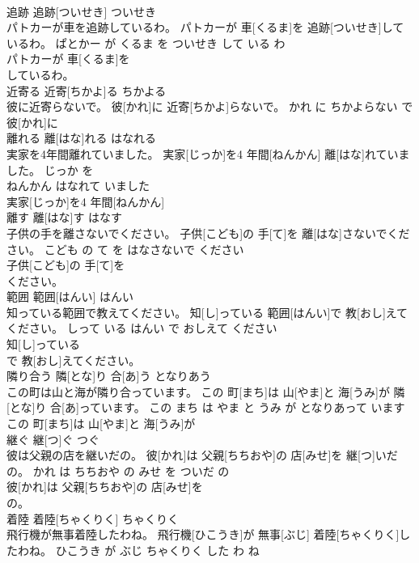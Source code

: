 \documentclass[8pt]{extreport}
\begin{document}
\begin{CJK}{UTF8}{min}
\\	追跡	追跡[ついせき]	ついせき	
\\	パトカーが車を追跡しているわ。	パトカーが 車[くるま]を 追跡[ついせき]しているわ。	ぱとかー が くるま を ついせき して いる わ	
\\	パトカーが 車[くるま]を
\\	しているわ。			
\\	近寄る	近寄[ちかよ]る	ちかよる	
\\	彼に近寄らないで。	彼[かれ]に 近寄[ちかよ]らないで。	かれ に ちかよらない で	
\\	彼[かれ]に
\\	離れる	離[はな]れる	はなれる	
\\	実家を4年間離れていました。	実家[じっか]を4 年間[ねんかん] 離[はな]れていました。	じっか を 
\\	ねんかん はなれて いました	
\\	実家[じっか]を4 年間[ねんかん]
\\	離す	離[はな]す	はなす	
\\	子供の手を離さないでください。	子供[こども]の 手[て]を 離[はな]さないでください。	こども の て を はなさないで ください	
\\	子供[こども]の 手[て]を
\\	ください。			
\\	範囲	範囲[はんい]	はんい	
\\	知っている範囲で教えてください。	知[し]っている 範囲[はんい]で 教[おし]えてください。	しって いる はんい で おしえて ください	
\\	知[し]っている
\\	で 教[おし]えてください。			
\\	隣り合う	隣[とな]り 合[あ]う	となりあう	
\\	この町は山と海が隣り合っています。	この 町[まち]は 山[やま]と 海[うみ]が 隣[とな]り 合[あ]っています。	この まち は やま と うみ が となりあって います	
\\	この 町[まち]は 山[やま]と 海[うみ]が
\\	継ぐ	継[つ]ぐ	つぐ	
\\	彼は父親の店を継いだの。	彼[かれ]は 父親[ちちおや]の 店[みせ]を 継[つ]いだの。	かれ は ちちおや の みせ を ついだ の	
\\	彼[かれ]は 父親[ちちおや]の 店[みせ]を
\\	の。			
\\	着陸	着陸[ちゃくりく]	ちゃくりく	
\\	飛行機が無事着陸したわね。	飛行機[ひこうき]が 無事[ぶじ] 着陸[ちゃくりく]したわね。	ひこうき が ぶじ ちゃくりく した わ ね	

\end{CJK}
\end{document}
